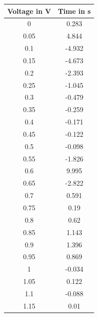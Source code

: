 \begin{minipage}{0.5\textwidth}
    \center
        \begin{tabular}{|c|c|}
            \hline
            Voltage in V & Time in s \\
            \hline
            0 & 0.283\\
            \hline
            0.05 & 4.844\\
            \hline
            0.1	& -4.932\\
            \hline
            0.15 & -4.673\\
            \hline
            0.2	& -2.393\\
            \hline
            0.25 & -1.045\\
            \hline
            0.3	& -0.479\\
            \hline
            0.35 & -0.259\\
            \hline
            0.4	& -0.171\\
            \hline
            0.45 & -0.122\\
            \hline
            0.5	& -0.098\\
            \hline
            0.55 & -1.826\\
            \hline
            0.6	& 9.995\\
            \hline
            0.65 & -2.822\\
            \hline
            0.7	& 0.591\\
            \hline
            0.75 & 0.19\\
            \hline
            0.8	& 0.62\\
            \hline
            0.85 & 1.143\\
            \hline
            0.9	& 1.396\\
            \hline
            0.95 & 0.869\\
            \hline
            1 & -0.034\\
            \hline
            1.05 & 0.122\\
            \hline
            1.1	& -0.088\\
            \hline
            1.15 & 0.01\\
            \hline
        \end{tabular}
        \label{Tab:Values of Voltage Graph 3}
\end{minipage}
